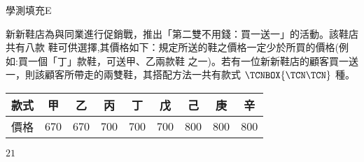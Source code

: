     \begin{QUESTION}
        \begin{ExamInfo}{95}{學測}{填充}{E}
        \end{ExamInfo}
        \begin{ExamAnsRateInfo}{68}{89}{75}{40}
        \end{ExamAnsRateInfo}
        \begin{QBODY}
            新新鞋店為與同業進行促銷戰，推出「第二雙不用錢：買一送一」的活動。該鞋店共有八款 鞋可供選擇,其價格如下：規定所送的鞋之價格一定少於所買的價格(例如:買一個「丁」款鞋，可送甲、乙兩款鞋 之一)。若有一位新新鞋店的顧客買一送一，則該顧客所帶走的兩雙鞋，其搭配方法一共有款式 
			$\TCNBOX{\TCN\TCN}$ 種。 
			\vspace*{0cm} 
			\begin{center}\begin{tabular}{|c|c|c|c|c|c|c|c|c|}  \hline 
			款式 & 甲 &乙 &丙 & 丁 &戊 & 己& 庚& 辛 \\ \hline 
			價格 & 670 & 670 & 700  & 700  & 700  & 800   & 800  & 800\\\hline
			\end{tabular}\end{center}
        \end{QBODY}
        \begin{QFROMS}
        \end{QFROMS}
        \begin{QTAGS}\end{QTAGS}
        \begin{QANS}
            $21$
        \end{QANS}
        \begin{QSOLLIST}
        \end{QSOLLIST}
        \begin{QEMPTYSPACE}
        \end{QEMPTYSPACE}
    \end{QUESTION}
